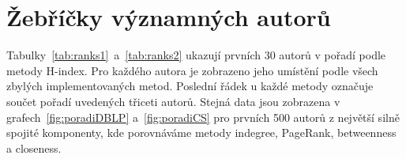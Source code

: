 \documentclass{bakalarka}
\begin{document}

\section{Žebříčky významných autorů}
Tabulky~\ref{tab:ranks1}~a~\ref{tab:ranks2} ukazují prvních 30 autorů v pořadí
podle metody H-index. Pro každého autora je zobrazeno jeho umístění podle všech
zbylých implementovaných metod. Poslední řádek u každé metody označuje součet
pořadí uvedených třiceti autorů. Stejná data jsou zobrazena v
grafech~\ref{fig:poradiDBLP} a~\ref{fig:poradiCS} pro prvních 500 autorů z
největší silně spojité komponenty, kde porovnáváme metody indegree, PageRank,
betweenness a closeness.
\end{document}
